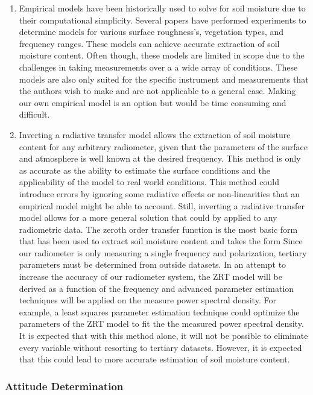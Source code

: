 \documentclass[12pt]{article}
\newcommand\boldblue[1]{\textcolor{blue}{\textbf{#1}}}
\begin{document}
\begin{enumerate}
\item Empirical models have been historically used to solve for soil moisture due to their computational simplicity. Several papers have performed experiments to determine models for various surface roughness's, vegetation types, and frequency ranges. These models can achieve accurate extraction of soil moisture content. Often though, these models are limited in scope due to the challenges in taking measurements over a a wide array of conditions. These models are also only suited for the specific instrument and measurements that the authors wish to make and are not applicable to a general case. Making our own empirical model is an option but would be time consuming and difficult.
\item Inverting a radiative transfer model allows the extraction of soil moisture content for any arbitrary radiometer, given that the parameters of the surface and atmosphere is well known at the desired frequency. This method is only as accurate as the ability to estimate the surface conditions and the applicability of the model to real world conditions. This method could introduce errors by ignoring some radiative effects or non-linearities that an empirical model might be able to account. Still, inverting a radiative transfer model allows for a more general solution that could by applied to any radiometric data. The zeroth order transfer function is the most basic form that has been used to extract soil moisture content and takes the form
Since our radiometer is only measuring a single frequency and polarization, tertiary parameters must be determined from outside datasets. In an attempt to increase the accuracy of our radiometer system, the ZRT model will be derived as a function of the frequency and advanced parameter estimation techniques will be applied on the measure power spectral density. For example, a least squares parameter estimation technique could optimize the parameters of the ZRT model to fit the the measured power spectral density. It is expected that with this method alone, it will not be possible to eliminate every variable without resorting to tertiary datasets. However, it is expected that this could lead to more accurate estimation of soil moisture content.
\end{enumerate}

\subsubsection{Attitude Determination}
\end{document}
